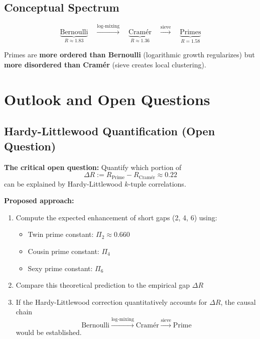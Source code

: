 \documentclass[11pt,a4paper]{article}
\theoremstyle{definition}
\theoremstyle{remark}
\begin{document}
\subsection{Conceptual Spectrum}

\begin{equation}
\underbrace{\text{Bernoulli}}_{R \approx 1.83}
\quad \xrightarrow{\text{log-mixing}} \quad
\underbrace{\text{Cramér}}_{R \approx 1.36}
\quad \xrightarrow{\text{sieve}} \quad
\underbrace{\text{Primes}}_{R = 1.58}
\end{equation}

Primes are \textbf{more ordered than Bernoulli} (logarithmic growth regularizes) but \textbf{more disordered than Cramér} (sieve creates local clustering).

\section{Outlook and Open Questions}

\subsection{Hardy-Littlewood Quantification (Open Question)}

\textbf{The critical open question:} Quantify which portion of
\begin{equation}
\Delta R := R_{\text{Prime}} - R_{\text{Cramér}} \approx 0.22
\end{equation}
can be explained by Hardy-Littlewood $k$-tuple correlations.

\textbf{Proposed approach:} 
\begin{enumerate}
\item Compute the expected enhancement of short gaps (2, 4, 6) using:
\begin{itemize}
\item Twin prime constant: $\Pi_2 \approx 0.660$
\item Cousin prime constant: $\Pi_4$
\item Sexy prime constant: $\Pi_6$
\end{itemize}
\item Compare this theoretical prediction to the empirical gap $\Delta R$
\item If the Hardy-Littlewood correction quantitatively accounts for $\Delta R$, the causal chain
\begin{equation}
\text{Bernoulli} \xrightarrow{\text{log-mixing}} \text{Cramér} \xrightarrow{\text{sieve}} \text{Prime}
\end{equation}
would be established.
\end{enumerate}
\end{document}
